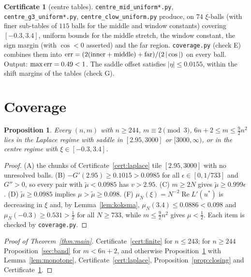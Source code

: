 \documentclass[11pt,reqno]{amsart}
\theoremstyle{plain}
\newtheorem{proposition}[theorem]{Proposition}
\theoremstyle{definition}
\newtheorem{certificate}[theorem]{Certificate}
\renewcommand{\Re}{\operatorname{Re}}
\begin{document}
\begin{certificate}[centre tables]\label{cert:centre}
\texttt{centre\_mid\_uniform*.py}, \texttt{centre\_g3\_uniform*.py}, \texttt{centre\_clow\_uniform.py} produce, on $74$ $\xi$-balls (with finer sub-tables of $115$ balls for the middle and window constants) covering
$[-0.3,3.4]$, uniform bounds for the middle stretch, the window constant, the sign margin (with $\cos<0$ asserted) and the far
region. \texttt{coverage.py} (check E) combines them into ${\rm err}=(2(\text{inner}+\text{middle})+\text{far})/(2\,|\cos|)$ on every
ball. Output: $\max{\rm err}=0.49<1$. The saddle offset satisfies $|\eta|\le0.0155$, within the shift margins of the tables (check G).
\end{certificate}

\section{Coverage}\label{sec:coverage}

\begin{proposition}\label{prop:coverage}
Every $(n,m)$ with $n\ge244$, $m\equiv2\pmod3$, $6n+2\le m\le\frac92n^2$ lies in the Laplace regime with saddle in $[2.95,3000]$ or
$[3000,\infty)$, or in the centre regime with $\xi\in[-0.3,3.4]$.
\end{proposition}
\begin{proof}
(A) the chunks of Certificate~\ref{cert:laplace} tile $[2.95,3000]$ with no unresolved balls. (B) $-G'(2.95)\ge0.1015>0.0985$ for all
$\epsilon\in[0,1/733]$ and $G''>0$, so every pair with $\widetilde\mu<0.0985$ has $v>2.95$. (C) $m\ge2N$ gives $\widetilde\mu\ge0.999\epsilon$.
(D) $\widetilde\mu\ge0.0985$ implies $\mu>\widetilde\mu\ge0.098$. (F) $\mu_N(\xi)=N^{-2}\Re L'(u^*)$ is decreasing in $\xi$ and, by
Lemma~\ref{lem:koksma}, $\mu_N(3.4)\le0.0886<0.098$ and $\mu_N(-0.3)\ge0.531>\frac12$ for all $N\ge733$, while $m\le\frac92n^2$ gives
$\mu<\frac12$. Each item is checked by \texttt{coverage.py}.
\end{proof}

\begin{proof}[Proof of Theorem~\ref{thm:main}]
Certificate~\ref{cert:finite} for $n\le243$; for $n\ge244$ Proposition~\ref{sec:band} for $m<6n+2$, and otherwise
Proposition~\ref{prop:coverage} with Lemma~\ref{lem:monotone}, Certificate~\ref{cert:laplace}, Proposition~\ref{prop:closing} and
Certificate~\ref{cert:centre}.
\end{proof}
\end{document}
